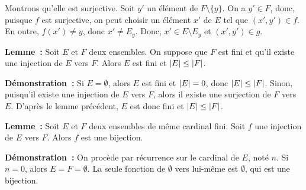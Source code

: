     Montrons qu'elle est surjective. 
    Soit $y'$ un élément de $F \setminus \lbrace y \rbrace$. 
    On a $y' \in F$, donc, puisque $f$ est surjective, on peut choisir un élément $x'$ de $E$ tel que $(x',y') \in f$. 
    En outre, $f(x') \neq y$, donc $x' \neq E_y$.
    Donc, $x' \in E \setminus E_y$ et $(x',y') \in g$. 

    \done

\medskip

\noindent\textbf{Lemme :} Soit $E$ et $F$ deux ensembles. 
    On suppose que $F$ est fini et qu'il existe une injection de $E$ vers $F$.
    Alors $E$ est fini et $\left\lvert E \right\rvert \leq \left\lvert F \right\rvert$.

\medskip

\noindent\textbf{Démonstration :} Si $E = \emptyset$, alors $E$ est fini et $\left\lvert E \right\rvert = 0$, donc $\left\lvert E \right\rvert \leq \left\lvert F \right\rvert$.
    Sinon, puisqu'il existe une injection de $E$ vers $F$, alors il existe une surjection de $F$ vers $E$.
    D'après le lemme précédent, $E$ est donc fini et $\left\lvert E \right\rvert \leq \left\lvert F \right\rvert$.

    \done

\medskip

\noindent\textbf{Lemme :} Soit $E$ et $F$ deux ensembles de même cardinal fini. 
    Soit $f$ une injection de $E$ vers $F$.
    Alors $f$ est une bijection. 

\medskip

\noindent\textbf{Démonstration :} On procède par récurrence sur le cardinal de $E$, noté $n$.
    Si $n = 0$, alors $E = F = \emptyset$. 
    La seule fonction de $\emptyset$ vers lui-même est $\emptyset$, qui est une bijection. 
    
